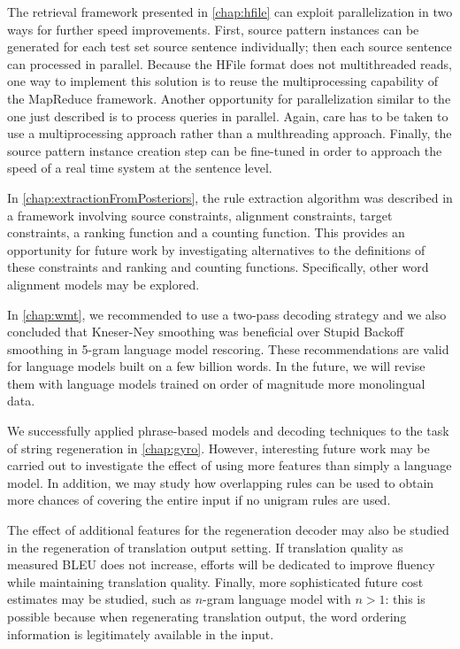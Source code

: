 The retrieval framework presented in \autoref{chap:hfile}
can exploit parallelization in two ways for further
speed improvements. First, source pattern instances
can be generated for each test set source sentence individually; then
each source sentence can processed in parallel. Because
the HFile format does not multithreaded reads, %
one way to implement this solution is to reuse the multiprocessing
capability of the MapReduce framework.
Another opportunity for parallelization similar to the one just described
is to process queries in parallel. Again, care has to be taken to use
a multiprocessing approach rather than a multhreading approach.
Finally, the source pattern instance creation step can be fine-tuned
in order to approach the speed of a real time system at the sentence
level.


In \autoref{chap:extractionFromPosteriors}, the rule extraction
algorithm was described in a framework involving
source constraints, alignment constraints, target constraints, a ranking
function and a counting function. This provides an opportunity
for future work by investigating alternatives to the definitions
of these constraints and ranking and counting functions.
Specifically, other word alignment models may be explored.


In \autoref{chap:wmt}, we recommended to use a two-pass
decoding strategy and we also concluded that Kneser-Ney
smoothing was beneficial over Stupid Backoff smoothing
in 5-gram language model rescoring. These recommendations
are valid for language models built on a few billion words.
In the future, we will revise them with language models
trained on order of magnitude more monolingual data.


We successfully applied phrase-based models and decoding
techniques to the task of string regeneration
in \autoref{chap:gyro}. However, interesting future work may
be carried out to investigate the effect of using more features
than simply a language model. In addition, we may study
how overlapping rules can be used to obtain more chances
of covering the entire input if no unigram rules are used.

The effect of additional features for the regeneration
decoder may also be studied in the regeneration of
translation output setting. If translation quality
as measured BLEU does not increase, efforts will be
dedicated to improve fluency while maintaining translation
quality. Finally, more sophisticated future cost estimates
may be studied, such as $n$-gram language model with $n > 1$: this
is possible because when regenerating translation output, the word
ordering information is legitimately available in the input.

